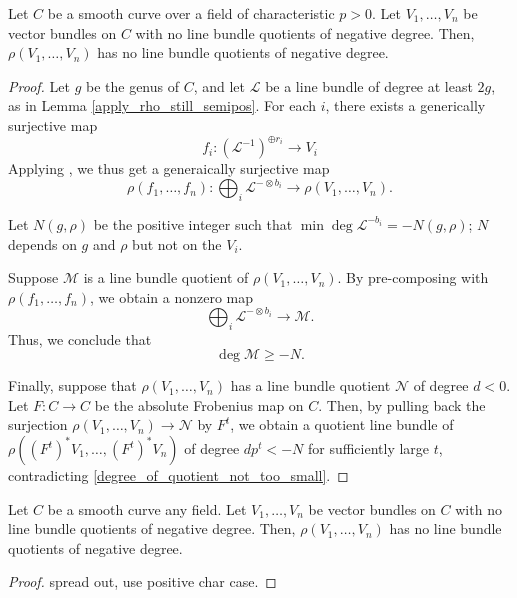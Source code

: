 \begin{lemma}
Let $C$ be a smooth curve over a field of characteristic $p>0$. Let $V_1,\ldots,V_n$ be vector bundles on $C$ with no line bundle quotients of negative degree. Then, $\rho(V_1,\ldots,V_n)$ has no line bundle quotients of negative degree.
\end{lemma}
\begin{proof}
Let $g$ be the genus of $C$, and let $\mathcal{L}$ be a line bundle of degree at least $2g$, as in Lemma \ref{apply_rho_still_semipos}. 
For each $i$, there exists a generically surjective map 
\begin{equation}
f_i:(\mathcal{L}^{-1})^{\oplus r_i}\to V_i
\end{equation}
Applying , we thus get a generaically surjective  map
\begin{equation}
\rho(f_1,\ldots,f_n):\bigoplus_{i}\mathcal{L}^{-\otimes b_i}\to\rho(V_1,\ldots,V_n).
\end{equation}

Let $N(g,\rho)$ be the positive integer such that $\min\deg\mathcal{L}^{-b_i}=-N(g,\rho)$; $N$ depends on $g$ and $\rho$ but not on the $V_i$.

Suppose $\mathcal{M}$ is a line bundle quotient of $\rho(V_1,\ldots,V_n)$. By pre-composing with $\rho(f_1,\ldots,f_n)$, we obtain a nonzero map
\begin{equation}
\bigoplus_{i}\mathcal{L}^{-\otimes b_i}\to\mathcal{M}.
\end{equation}
Thus, we conclude that
\begin{equation*}\label{degree_of_quotient_not_too_small}
\deg\mathcal{M}\ge -N.
\end{equation*}


Finally, suppose that $\rho(V_1,\ldots,V_n)$ has a line bundle quotient $\mathcal{N}$ of degree $d<0$. Let $F:C\to C$ be the absolute Frobenius map on $C$. Then, by pulling back the surjection $\rho(V_1,\ldots,V_n)\to\mathcal{N}$ by $F^t$, we obtain a quotient line bundle of $\rho((F^{t})^{*}V_1,\ldots,(F^{t})^{*}V_n)$ of degree $dp^{t}<-N$ for sufficiently large $t$, contradicting \ref{degree_of_quotient_not_too_small}.

\end{proof}

\begin{lemma}\label{no_negative_quotient_on_curve}
Let $C$ be a smooth curve any field. Let $V_1,\ldots,V_n$ be vector bundles on $C$ with no line bundle quotients of negative degree. Then, $\rho(V_1,\ldots,V_n)$ has no line bundle quotients of negative degree.
\end{lemma}
\begin{proof}
spread out, use positive char case.
\end{proof}


